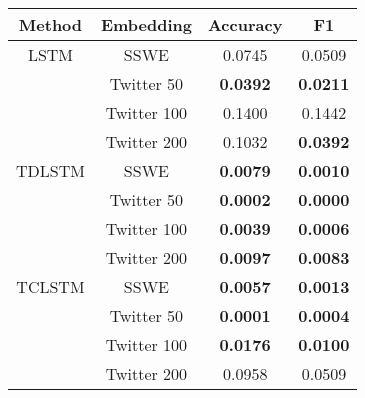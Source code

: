 \begin{tabular}{|c|c|c|c|}
\hline
Method & Embedding &  Accuracy &      F1 \\
\hline
LSTM & SSWE &    0.0745 &  0.0509 \\
& Twitter 50 &    \textbf{0.0392} &  \textbf{0.0211} \\
& Twitter 100 &    0.1400 &  0.1442 \\
& Twitter 200 &    0.1032 &  \textbf{0.0392} \\
\hline
TDLSTM & SSWE &    \textbf{0.0079} &  \textbf{0.0010} \\
& Twitter 50 &    \textbf{0.0002} &  \textbf{0.0000} \\
& Twitter 100 &    \textbf{0.0039} &  \textbf{0.0006} \\
& Twitter 200 &    \textbf{0.0097} &  \textbf{0.0083} \\
\hline
TCLSTM & SSWE &    \textbf{0.0057} &  \textbf{0.0013} \\
& Twitter 50 &    \textbf{0.0001} &  \textbf{0.0004} \\
& Twitter 100 &    \textbf{0.0176} &  \textbf{0.0100} \\
& Twitter 200 &    0.0958 &  0.0509 \\
\hline
\end{tabular}